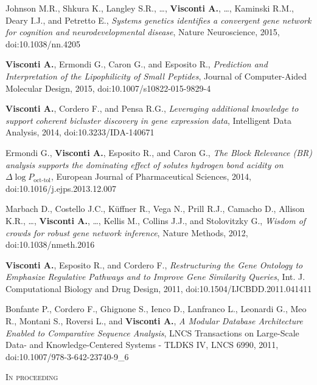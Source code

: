 \documentclass[a4paper,10pt]{article}
\newcommand{\smalltitle}[1]{
	\vspace{0.1cm}
	{\noindent 
	\large \textsc{#1}}
	\vspace{0.1cm}
}
\begin{document}
{\begin{itemize}
		
		 Johnson M.R., Shkura K., Langley S.R., \dots, \textbf{Visconti A.}, \dots, Kaminski R.M., Deary I.J., and Petretto E., \emph{Systems genetics identifies a convergent gene network for cognition and neurodevelopmental disease}, Nature Neuroscience, 2015, doi:10.1038/nn.4205

		 \textbf{Visconti A.}, Ermondi G., Caron G., and Esposito R., \emph{Prediction and Interpretation of the Lipophilicity of Small Peptides}, Journal of Computer-Aided Molecular Design, 2015, doi:10.1007/s10822-015-9829-4
		
		 \textbf{Visconti A.}, Cordero F., and Pensa R.G., \emph{Leveraging additional knowledge to support coherent bicluster discovery in gene expression data}, Intelligent Data Analysis, 2014, doi:10.3233/IDA-140671
	
		 Ermondi G., \textbf{Visconti A.}, Esposito R., and Caron G., \emph{The Block Relevance (BR) analysis supports the dominating effect of solutes hydrogen bond acidity on $\Delta \log P_{\text{oct-tol}}$}, European Journal of Pharmaceutical Sciences, 2014, doi:10.1016/j.ejps.2013.12.007
		
		 Marbach D., Costello J.C., K\"{u}ffner R., Vega N., Prill R.J., Camacho D., Allison K.R., \dots, \textbf{Visconti A.}, \dots, Kellis M., Collins J.J., and Stolovitzky G., \emph{Wisdom of crowds for robust gene network inference}, Nature Methods, 2012, doi:10.1038/nmeth.2016

		 \textbf{Visconti A.}, Esposito R., and Cordero F., \emph{Restructuring the Gene Ontology to Emphasize Regulative Pathways and to Improve Gene Similarity Queries}, Int. J. Computational Biology and Drug Design, 2011, doi:10.1504/IJCBDD.2011.041411

		 Bonfante P., Cordero F., Ghignone S., Ienco D., Lanfranco L., Leonardi G., Meo R., Montani S., Roversi L., and \textbf{Visconti A.}, \emph{A Modular Database Architecture Enabled to Comparative Sequence Analysis}, LNCS Transactions on Large-Scale Data- and Knowledge-Centered Systems - TLDKS IV, LNCS 6990, 2011, doi:10.1007/978-3-642-23740-9\_6
 	\end{itemize}
}

\vspace{0.4cm}

\smalltitle{In proceeding}
\end{document}
